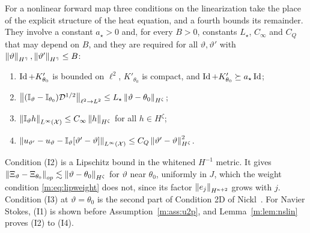 For a nonlinear forward map three conditions on the linearization take the place of the explicit structure of the heat equation, and a fourth bounds its remainder. They involve a constant $a_\star>0$ and, for every $B>0$, constants $L_\star$, $C_\infty$ and $C_Q$ that may depend on $B$, and they are required for all $\vartheta,\vartheta'$ with $\left\|\vartheta\right\|_{H^{\bar\gamma}},\left\|\vartheta'\right\|_{H^{\bar\gamma}}\le B$:
\begin{enumerate}[label=(I\arabic*),nosep]
\item $\operatorname{Id}+K'_{\theta_0}$ is bounded on $\ell^2$, $K'_{\theta_0}$ is compact, and $\operatorname{Id}+K'_{\theta_0}\succeq a_\star\operatorname{Id}$;
\item $\left\|(\mathbb{I}_\vartheta-\mathbb{I}_{\theta_0})\mathcal D^{1/2}\right\|_{\ell^2\to L^2}\le L_\star\left\|\vartheta-\theta_0\right\|_{H^\zeta}$;
\item $\left\|\mathbb{I}_\vartheta h\right\|_{L^\infty(\mathcal X)}\le C_\infty\left\|h\right\|_{H^\zeta}$ for all $h\in H^\zeta$;
\item $\left\|u_{\vartheta'}-u_\vartheta-\mathbb{I}_\vartheta[\vartheta'-\vartheta]\right\|_{L^\infty(\mathcal X)}\le C_Q\left\|\vartheta'-\vartheta\right\|^2_{H^\zeta}$.
\end{enumerate}
Condition (I2) is a Lipschitz bound in the whitened $H^{-1}$ metric. It gives $\left\|\Xi_\vartheta-\Xi_{\theta_0}\right\|_{op}\lesssim\left\|\vartheta-\theta_0\right\|_{H^\zeta}$ for $\vartheta$ near $\theta_0$, uniformly in $J$, which the weight condition \eqref{m:eq:lipweight} does not, since its factor $\left\|e_j\right\|_{H^{\kappa+2}}$ grows with $j$. Condition (I3) at $\vartheta=\theta_0$ is the second part of Condition 2D of Nickl~\cite{nicklbvm2024}. For Navier Stokes, (I1) is shown before Assumption~\ref{m:ass:u2p}, and Lemma~\ref{m:lem:nslin} proves (I2) to (I4).

